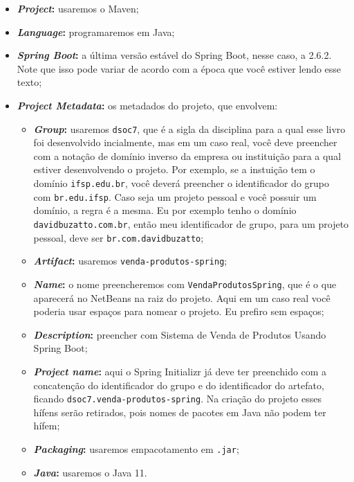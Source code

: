 \begin{itemize}
    \item \textbf{\textit{Project}:} usaremos o Maven;
    \item \textbf{\textit{Language}:} programaremos em Java;
    \item \textbf{\textit{Spring Boot}:} a última versão estável do Spring Boot, nesse caso, a 2.6.2. Note que isso pode variar de acordo com a época que você estiver lendo esse texto;
    \item \textbf{\textit{Project Metadata}:} os metadados do projeto, que envolvem:
    \begin{itemize}
        \item \textbf{\textit{Group}:} usaremos \texttt{dsoc7}, que é a sigla da disciplina para a qual esse livro foi desenvolvido incialmente, mas em um caso real, você deve preencher com a notação de domínio inverso da empresa ou instituição para a qual estiver desenvolvendo o projeto. Por exemplo, se a instuição tem o domínio \texttt{ifsp.edu.br}, você deverá preencher o identificador do grupo com \texttt{br.edu.ifsp}. Caso seja um projeto pessoal e você possuir um domínio, a regra é a mesma. Eu por exemplo tenho o domínio \texttt{davidbuzatto.com.br}, então meu identificador de grupo, para um projeto pessoal, deve ser \texttt{br.com.davidbuzatto};
        \item \textbf{\textit{Artifact}:} usaremos \texttt{venda-produtos-spring};
        \item \textbf{\textit{Name}:} o nome preencheremos com \texttt{VendaProdutosSpring}, que é o que aparecerá no NetBeans na raiz do projeto. Aqui em um caso real você poderia usar espaços para nomear o projeto. Eu prefiro sem espaços;
        \item \textbf{\textit{Description}:} preencher com Sistema de Venda de Produtos Usando Spring Boot;
        \item \textbf{\textit{Project name}:} aqui o Spring Initializr já deve ter preenchido com a concatenção do identificador do grupo e do identificador do artefato, ficando \texttt{dsoc7.venda-produtos-spring}. Na criação do projeto esses hífens serão retirados, pois nomes de pacotes em Java não podem ter hífem;
        \item \textbf{\textit{Packaging}:} usaremos empacotamento em \texttt{.jar};
        \item \textbf{\textit{Java}:} usaremos o Java 11.
    \end{itemize}
\end{itemize}

